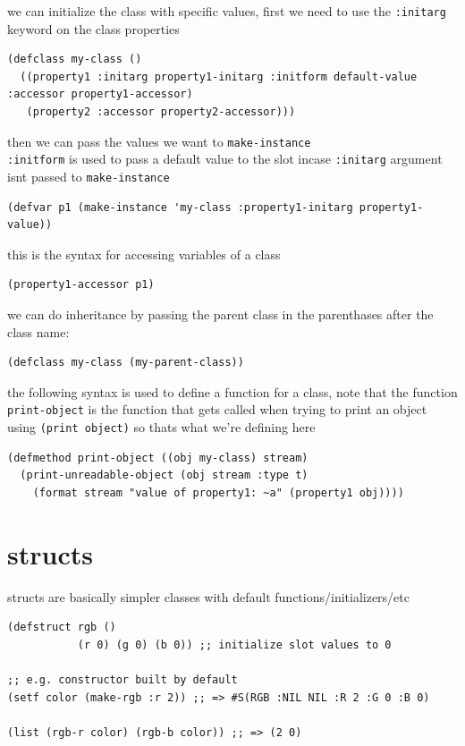 \documentclass[a4paper,12pt]{article}
\begin{document}
we can initialize the class with specific values, first we need to use the \texttt{:initarg} keyword on the class properties\\
\lstset{language=Lisp,label= ,caption= ,captionpos=b,numbers=none}
\begin{lstlisting}
(defclass my-class ()
  ((property1 :initarg property1-initarg :initform default-value :accessor property1-accessor)
   (property2 :accessor property2-accessor)))
\end{lstlisting}

then we can pass the values we want to \texttt{make-instance}\\
\texttt{:initform} is used to pass a default value to the slot incase \texttt{:initarg} argument isnt passed to \texttt{make-instance}\\
\lstset{language=Lisp,label= ,caption= ,captionpos=b,numbers=none}
\begin{lstlisting}
(defvar p1 (make-instance 'my-class :property1-initarg property1-value))
\end{lstlisting}

this is the syntax for accessing variables of a class\\
\lstset{language=Lisp,label= ,caption= ,captionpos=b,numbers=none}
\begin{lstlisting}
(property1-accessor p1)
\end{lstlisting}
we can do inheritance by passing the parent class in the parenthases after the class name:\\
\lstset{language=Lisp,label= ,caption= ,captionpos=b,numbers=none}
\begin{lstlisting}
(defclass my-class (my-parent-class))
\end{lstlisting}
the following syntax is used to define a function for a class, note that the function \texttt{print-object} is the function that gets called when trying to print an object using \texttt{(print object)} so thats what we're defining here\\
\lstset{language=Lisp,label= ,caption= ,captionpos=b,numbers=none}
\begin{lstlisting}
(defmethod print-object ((obj my-class) stream)
  (print-unreadable-object (obj stream :type t)
    (format stream "value of property1: ~a" (property1 obj))))
\end{lstlisting}
\section{structs}
\label{sec:org70917ce}
structs are basically simpler classes with default functions/initializers/etc\\
\lstset{language=Lisp,label= ,caption= ,captionpos=b,numbers=none}
\begin{lstlisting}
(defstruct rgb ()
           (r 0) (g 0) (b 0)) ;; initialize slot values to 0

;; e.g. constructor built by default
(setf color (make-rgb :r 2)) ;; => #S(RGB :NIL NIL :R 2 :G 0 :B 0)

(list (rgb-r color) (rgb-b color)) ;; => (2 0)
\end{lstlisting}
\end{document}
